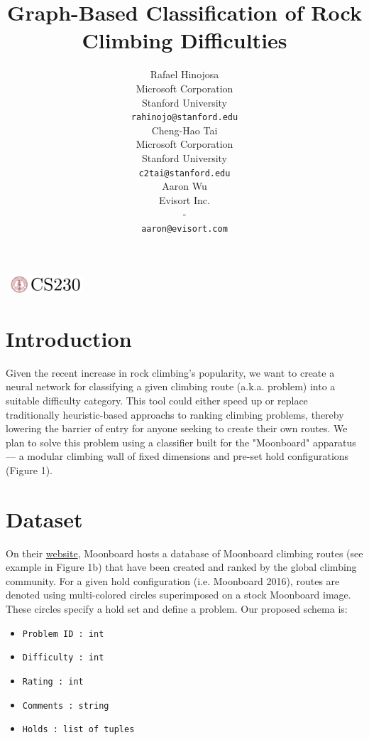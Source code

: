 \documentclass{article}
\title{Graph-Based Classification of Rock Climbing Difficulties}
\author{
  Rafael Hinojosa \\
  Microsoft Corporation \\
  Stanford University \\
  \texttt{rahinojo@stanford.edu} \\ 
  \And
  Cheng-Hao Tai \\
  Microsoft Corporation \\
  Stanford University \\
  \texttt{c2tai@stanford.edu} \\
  \And
  Aaron Wu \\
  Evisort Inc. \\
  - \\
  \texttt{aaron@evisort.com} \\
}
\begin{document}

\begin{center}
\includegraphics[width=3cm, height=0.7cm]{CS230}
\end{center}

\maketitle

\section{Introduction}	
Given the recent increase in rock climbing's popularity, we want to create a neural network for classifying a given climbing route (a.k.a. problem) into a suitable difficulty category. This tool could either speed up or replace traditionally heuristic-based approachs to ranking climbing problems, thereby lowering the barrier of entry for anyone seeking to create their own routes. We plan to solve this problem using a classifier built for the "Moonboard" apparatus --- a modular climbing wall of fixed dimensions and pre-set hold configurations (Figure 1). 

\section{Dataset}
On their \href{https://moonboard.com/}{website}, Moonboard hosts a database of Moonboard climbing routes (see example in Figure 1b) that have been created and ranked by the global climbing community. For a given hold configuration (i.e. Moonboard 2016), routes are denoted using multi-colored circles superimposed on a stock Moonboard image. These circles specify a hold set and define a problem. Our proposed schema is:

\begin{itemize}
\setlength\itemsep{0.1em}
\item \texttt{Problem ID : int}
\item \texttt{Difficulty : int}
\item \texttt{Rating : int}
\item \texttt{Comments : string}
\item \texttt{Holds : list of tuples}
\end{itemize}
\end{document}
